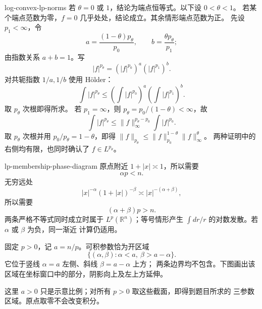 \begin{solution}{log-convex-lp-norms}
若 \(\theta=0\) 或 \(1\)，结论为端点恒等式。以下设 \(0<\theta<1\)。
若某个端点范数为零，\(f=0\) 几乎处处，结论成立。其余情形端点范数为正。
先设 \(p_1<\infty\)，令
\[
 a=\frac{(1-\theta)p_\theta}{p_0},\qquad
 b=\frac{\theta p_\theta}{p_1};
\]
由指数关系 \(a+b=1\)。写
\[
 |f|^{p_\theta}
 =(|f|^{p_0})^a(|f|^{p_1})^b.
\]
对共轭指数 \(1/a,1/b\) 使用 Hölder：
\[
 \int|f|^{p_\theta}
 \le\left(\int|f|^{p_0}\right)^a
     \left(\int|f|^{p_1}\right)^b.
\]
取 \(p_\theta\) 次根即得所求。
若 \(p_1=\infty\)，则 \(p_\theta=p_0/(1-\theta)<\infty\)，故
\[
 \int|f|^{p_\theta}
 \le\|f\|_\infty^{p_\theta-p_0}\int|f|^{p_0}.
\]
取 \(p_\theta\) 次根并用 \(p_0/p_\theta=1-\theta\)，即得
\(\|f\|_{p_\theta}\le\|f\|_{p_0}^{1-\theta}\|f\|_\infty^\theta\)。
两种证明中的右侧均有限，也同时确认了 \(f\in L^{p_\theta}\)。
\end{solution}

\begin{solution}{lp-membership-phase-diagram}
原点附近 \(1+|x|\asymp1\)，所以需要
\[
 \alpha p<n.
\]
无穷远处
\[
 |x|^{-\alpha}(1+|x|)^{-\beta}
 \asymp |x|^{-(\alpha+\beta)},
\]
所以需要
\[
 (\alpha+\beta)p>n.
\]
两条严格不等式同时成立时属于 \(L^p(\mathbb R^n)\)；等号情形产生
\(\int dr/r\) 的对数发散。若 \(\alpha\) 或 \(\beta\) 为负，同一渐近
计算仍适用。

固定 \(p>0\)，记 \(a=n/p\)。可积参数恰为开区域
\[
 \{(\alpha,\beta):\alpha<a,\ \beta>a-\alpha\}.
\]
它位于竖线 \(\alpha=a\) 左侧、斜线 \(\beta=a-\alpha\) 上方；
两条边界均不包含。下图画出该区域在坐标窗口中的部分，阴影向上及左上方延伸。

\begin{center}
\end{center}
这里 \(a>0\) 只是示意比例；对所有 \(p>0\) 取这些截面，即得到题目所求的
三参数区域。原点取零不会改变积分。
\end{solution}
